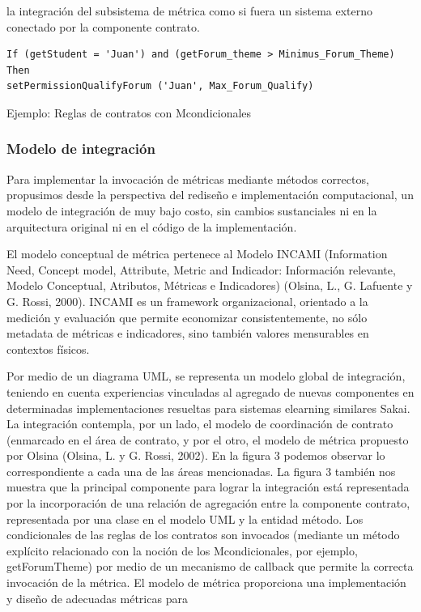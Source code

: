 {la integración del subsistema de métrica como si fuera un sistema externo
conectado por la componente contrato.


\begin{verbatim}
If (getStudent = 'Juan') and (getForum_theme > Minimus_Forum_Theme)
Then
setPermissionQualifyForum ('Juan', Max_Forum_Qualify)
\end{verbatim} 
\caption {Ejemplo: Reglas de contratos con Mcondicionales}


\subsubsection {Modelo de integración}

Para implementar la invocación de métricas mediante métodos correctos, propusimos
desde la perspectiva del rediseño e implementación computacional,
un modelo de integración de muy bajo costo, sin cambios sustanciales ni en la
arquitectura original ni en el código de la implementación.

El modelo conceptual de métrica pertenece al Modelo INCAMI (Information Need, Concept model, Attribute, Metric and Indicador: Información relevante, Modelo Conceptual, Atributos, Métricas e Indicadores) (Olsina, L., G. Lafuente y G. Rossi, 2000). INCAMI es un framework organizacional, orientado a la medición y evaluación que permite economizar consistentemente, no sólo metadata de métricas e indicadores, sino también valores mensurables en contextos físicos.


Por medio de un diagrama UML, se representa un modelo global de integración, teniendo en cuenta experiencias vinculadas al agregado de nuevas componentes en determinadas implementaciones resueltas para sistemas elearning similares Sakai. La integración contempla, por un lado, el modelo de coordinación de contrato (enmarcado en el área de contrato, y por el otro, el modelo de métrica propuesto por Olsina (Olsina, L. y G. Rossi, 2002). En la figura 3 podemos observar lo correspondiente a cada una de las áreas mencionadas. La figura 3 también nos muestra que la principal componente para lograr la integración está representada por la incorporación de una relación de agregación entre la componente contrato, representada por una clase en el modelo UML y la entidad método. Los condicionales de las reglas de los contratos son
invocados (mediante un método explícito relacionado con la noción de los
Mcondicionales, por ejemplo, getForumTheme) por medio de un mecanismo
de callback que permite la correcta invocación de la métrica. El modelo de
métrica proporciona una implementación y diseño de adecuadas métricas para

}
